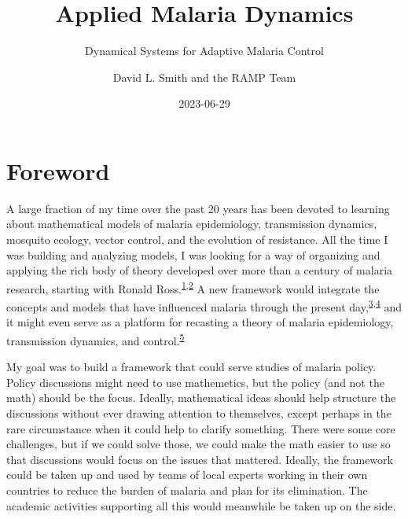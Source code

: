 \documentclass[
]{book}
\title{Applied Malaria Dynamics}
\subtitle{Dynamical Systems for Adaptive Malaria Control}
\author{David L. Smith and the RAMP Team}
\date{2023-06-29}
\begin{document}
\maketitle

{
\setcounter{tocdepth}{2}
\tableofcontents
}
\hypertarget{foreword}{%
\chapter*{Foreword}\label{foreword}}

A large fraction of my time over the past 20 years has been devoted to learning about mathematical models of malaria epidemiology, transmission dynamics, mosquito ecology, vector control, and the evolution of resistance. All the time I was building and analyzing models, I was looking for a way of organizing and applying the rich body of theory developed over more than a century of malaria research, starting with Ronald Ross.\textsuperscript{\protect\hyperlink{ref-RossR1911Book}{1},\protect\hyperlink{ref-SmithDL2012_RossMacdonald}{2}}
A new framework would integrate the concepts and models that have influenced malaria through the present day,\textsuperscript{\protect\hyperlink{ref-ReinerRC2013SystematicReview}{3},\protect\hyperlink{ref-SmithNR2018AgentbasedModels}{4}} and it might even serve as a platform for recasting a theory of malaria epidemiology, transmission dynamics, and control.\textsuperscript{\protect\hyperlink{ref-SmithDL2014_Recasting}{5}}

My goal was to build a framework that could serve studies of malaria policy.
Policy discussions might need to use mathemetics, but the policy (and not the math) should be the focus.
Ideally, mathematical ideas should help structure the discussions without ever drawing attention to themselves, except perhaps in the rare circumstance when it could help to clarify something.
There were some core challenges, but if we could solve those, we could make the math easier to use so that discussions would focus on the issues that mattered.
Ideally, the framework could be taken up and used by teams of local experts working in their own countries to reduce the burden of malaria and plan for its elimination.
The academic activities supporting all this would meanwhile be taken up on the side.
\end{document}
